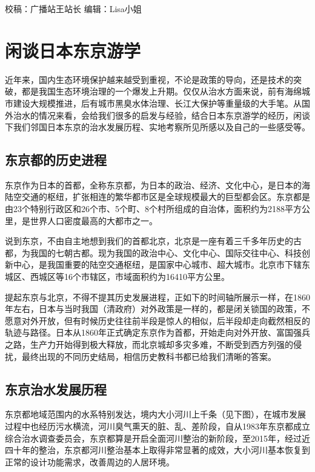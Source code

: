 \documentclass[
]{book}
\begin{document}
校稿：广播站王站长
编辑：Lisa小姐

\hypertarget{ux95f2ux8c08ux65e5ux672cux4e1cux4eacux6e38ux5b66}{%
\section{闲谈日本东京游学}\label{ux95f2ux8c08ux65e5ux672cux4e1cux4eacux6e38ux5b66}}

近年来，国内生态环境保护越来越受到重视，不论是政策的导向，还是技术的突破，都是我国生态环境治理的一个爆发上升期。仅仅从治水方面来说，前有海绵城市建设大规模推进，后有城市黑臭水体治理、长江大保护等重量级的大手笔。从国外治水的情况来看，会给我们很多的启发与经验，结合日本东京游学的经历，闲谈下我们邻国日本东京的治水发展历程、实地考察所见所感以及自己的一些感受等。

\hypertarget{ux4e1cux4eacux90fdux7684ux5386ux53f2ux8fdbux7a0b}{%
\subsection{东京都的历史进程}\label{ux4e1cux4eacux90fdux7684ux5386ux53f2ux8fdbux7a0b}}

东京作为日本的首都，全称东京都，为日本的政治、经济、文化中心，是日本的海陆空交通的枢纽，扩张相连的繁华都市区是全球规模最大的巨型都会区。东京都是由23个特别行政区和26个市、5个町、8个村所组成的自治体，面积约为2188平方公里，是世界人口密度最高的大都市之一。

说到东京，不由自主地想到我们的首都北京，北京是一座有着三千多年历史的古都，为我国的七朝古都。现为我国的政治中心、文化中心、国际交往中心、科技创新中心，是我国重要的陆空交通枢纽，是国家中心城市、超大城市。北京市下辖东城区、西城区等16个市辖区，市域面积约为16410平方公里。

提起东京与北京，不得不提其历史发展进程，正如下的时间轴所展示一样，在1860年左右，日本与当时我国（清政府）对外政策是一样的，都是闭关锁国的政策，不愿意对外开放，但有时候历史往往前半段是惊人的相似，后半段却走向截然相反的轨迹与路径。日本从1860年正式确定东京作为首都，开始走向对外开放、富国强兵之路，生产力开始得到极大释放，而北京城却多灾多难，不断受到西方列强的侵扰，最终出现的不同历史结局，相信历史教科书都已给我们清晰的答案。

\hypertarget{ux4e1cux4eacux6cbbux6c34ux53d1ux5c55ux5386ux7a0b}{%
\subsection{东京治水发展历程}\label{ux4e1cux4eacux6cbbux6c34ux53d1ux5c55ux5386ux7a0b}}

东京都地域范围内的水系特别发达，境内大小河川上千条（见下图），在城市发展过程中也经历污水横流，河川臭气熏天的脏、乱、差阶段，自从1983年东京都成立综合治水调查委员会，东京都算是开启全面河川整治的新阶段，至2015年，经过近四十年的整治，东京都河川整治基本上取得非常显著的成效，大小河川基本恢复到正常的设计功能需求，改善周边的人居环境。
\end{document}
